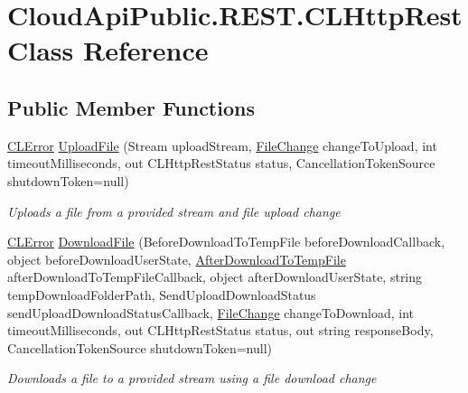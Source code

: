 \hypertarget{class_cloud_api_public_1_1_r_e_s_t_1_1_c_l_http_rest}{\section{Cloud\-Api\-Public.\-R\-E\-S\-T.\-C\-L\-Http\-Rest Class Reference}
\label{class_cloud_api_public_1_1_r_e_s_t_1_1_c_l_http_rest}
}
\subsection*{Public Member Functions}
\begin{DoxyCompactItemize}
\item 
\hyperlink{class_cloud_api_public_1_1_model_1_1_c_l_error}{C\-L\-Error} \hyperlink{class_cloud_api_public_1_1_r_e_s_t_1_1_c_l_http_rest_acb707f3d2f89efa43abf29affe10a821}{Upload\-File} (Stream upload\-Stream, \hyperlink{class_cloud_api_public_1_1_model_1_1_file_change}{File\-Change} change\-To\-Upload, int timeout\-Milliseconds, out C\-L\-Http\-Rest\-Status status, Cancellation\-Token\-Source shutdown\-Token=null)
\begin{DoxyCompactList}\small\item\em Uploads a file from a provided stream and file upload change \end{DoxyCompactList}\item 
\hyperlink{class_cloud_api_public_1_1_model_1_1_c_l_error}{C\-L\-Error} \hyperlink{class_cloud_api_public_1_1_r_e_s_t_1_1_c_l_http_rest_a6a22cb358a297f8562f550a1f89be51d}{Download\-File} (Before\-Download\-To\-Temp\-File before\-Download\-Callback, object before\-Download\-User\-State, \hyperlink{namespace_cloud_api_public_1_1_r_e_s_t_add2499738a8a21303b4181e302bb26d2}{After\-Download\-To\-Temp\-File} after\-Download\-To\-Temp\-File\-Callback, object after\-Download\-User\-State, string temp\-Download\-Folder\-Path, Send\-Upload\-Download\-Status send\-Upload\-Download\-Status\-Callback, \hyperlink{class_cloud_api_public_1_1_model_1_1_file_change}{File\-Change} change\-To\-Download, int timeout\-Milliseconds, out C\-L\-Http\-Rest\-Status status, out string response\-Body, Cancellation\-Token\-Source shutdown\-Token=null)
\begin{DoxyCompactList}\small\item\em Downloads a file to a provided stream using a file download change \end{DoxyCompactList}\item 

\end{DoxyCompactItemize}

